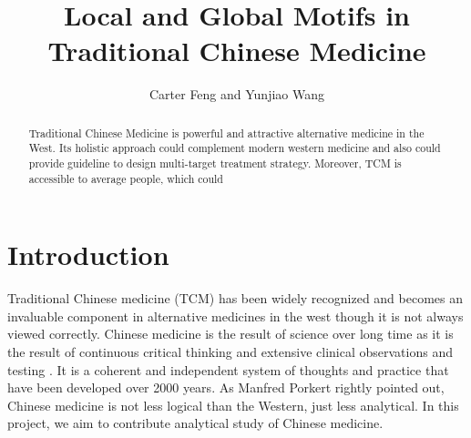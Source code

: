 \documentclass{article}
\title{Local and Global Motifs in Traditional Chinese Medicine}
\author{Carter Feng and Yunjiao Wang}
\begin{document}
\maketitle
\begin{abstract}
    Traditional Chinese Medicine is powerful and attractive alternative medicine in the West. Its holistic approach could complement modern western medicine and also could provide guideline to design multi-target treatment strategy. Moreover, TCM is accessible to average people, which could    
\end{abstract}
\section{Introduction}
Traditional Chinese medicine (TCM) has been widely recognized  and becomes an invaluable component in alternative medicines in the west \cite{Kaptchuk2000} though it is not always viewed correctly.   Chinese medicine is the result of science over long time as it is the result of continuous critical thinking and extensive clinical observations and testing \cite{Kaptchuk2000}. It is a coherent and independent system of thoughts and practice that have been developed over 2000 years.   As Manfred Porkert \cite{Porkert1990} rightly pointed out, Chinese medicine is not less logical than the Western, just less analytical. In this project, we aim to contribute analytical study of Chinese medicine. 
\end{document}
